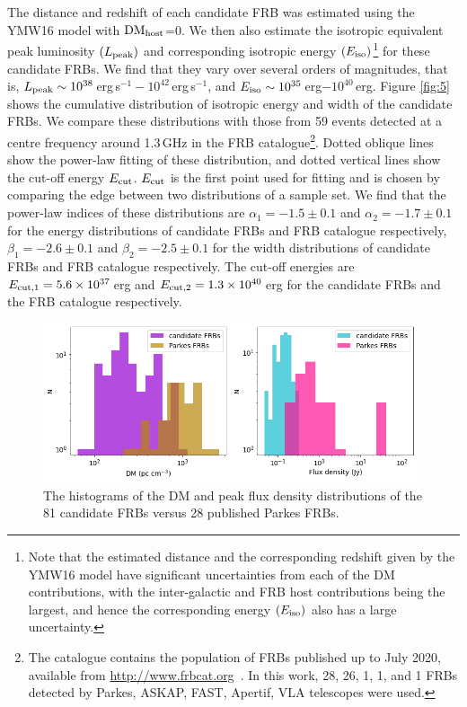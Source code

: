 \documentclass[fleqn,usenatbib]{mnras}
\begin{document}
%
The distance and redshift of each candidate FRB was estimated using the YMW16 model with ${\rm DM}_{\rm host}$=0.
We then also estimate the isotropic equivalent peak luminosity $(L_{\rm peak})$ and corresponding isotropic energy $(E_{\rm iso})$\footnote{Note that the estimated distance and the corresponding redshift given by the YMW16 model have significant uncertainties from each of the DM contributions, with the inter-galactic and FRB host contributions being the largest, and hence the corresponding energy $(E_{\rm iso})$ also has a large uncertainty. } for these candidate FRBs. 
We find that they vary over several orders of magnitudes, that is, $L_{\rm peak}\sim 10^{38}$\,erg\,s$^{-1}-10^{42}$\,erg\,s$^{-1}$, and $E_{\rm iso}\sim10^{35}$\,erg$-10^{40}$\,erg.
%
Figure \ref{fig:5} shows the cumulative distribution of isotropic energy and width of the candidate FRBs. We compare these distributions with those from 59 events detected at a centre frequency around 1.3\,GHz in the FRB catalogue\footnote{
The catalogue contains the population of FRBs published up to July 2020, available from \url{http://www.frbcat.org}~\citep{petroff_frbcat}. In this work, 28, 26, 1, 1, and 1 FRBs detected by Parkes, ASKAP, FAST, Apertif, VLA telescopes were used.}. Dotted oblique lines show the power-law fitting of these distribution, and dotted vertical lines show the cut-off energy $E_{\rm cut}$. 
$E_{\rm cut}$ is the first point used for fitting and is chosen by comparing the edge between two distributions of a sample set.
We find that the power-law indices of these distributions are $\alpha_1=-1.5\pm0.1$ and $\alpha_2=-1.7\pm0.1$ for the energy distributions of candidate FRBs and FRB catalogue respectively, $\beta_1=-2.6\pm0.1$ and $\beta_2=-2.5\pm0.1$ for the width distributions of candidate FRBs and FRB catalogue respectively.
The cut-off energies are $E_{\rm cut,1}=5.6\times10^{37}$\,erg and $E_{\rm cut,2}=1.3\times10^{40}$\,erg for the candidate FRBs and the FRB catalogue respectively.



\begin{figure}
	\includegraphics[width=0.98\textwidth]{pic/DM_Flux_0421.png}
    \caption{The histograms of the DM and peak flux density distributions of the 81 candidate FRBs versus 28 published Parkes FRBs. }
    \label{fig:4}
\end{figure}
\end{document}
